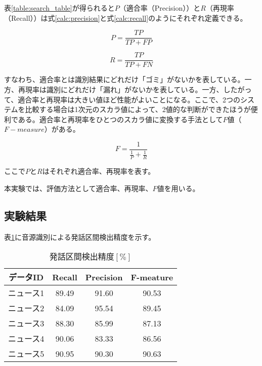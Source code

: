 表\ref{table:search_table}が得られると$P$（適合率（Precision））と$R$（再現率（Recall））は式\ref{calc:precision}と式\ref{calc:recall}のようにそれぞれ定義できる。

\begin{equation}
\label{calc:precision}
P = \frac{TP}{TP + FP}
\end{equation}

\begin{equation}
\label{calc:recall}
R = \frac{TP}{TP + FN}
\end{equation}

すなわち、適合率とは識別結果にどれだけ「ゴミ」がないかを表している。一方、再現率は識別にどれだけ「漏れ」がないかを表している。一方、したがって、適合率と再現率は大きい値ほど性能がよいことになる。ここで、2つのシステムを比較する場合は1次元のスカラ値によって、2値的な判断ができたほうが便利である。適合率と再現率をひとつのスカラ値に変換する手法として$F$値（$F-measure$）がある。

\begin{equation}
\label{calc:fmeasure}
F = \frac{1}{\frac{1}{P} + \frac{1}{R}}
\end{equation}

ここで$P$と$R$はそれぞれ適合率、再現率を表す。\par
本実験では、評価方法として適合率、再現率、$F$値を用いる。
\subsection{実験結果}
表\ref{table:test_detail_RPF}に音源識別による発話区間検出精度を示す。

\begin{table}[H]
  \begin{center}
    \caption{発話区間検出精度$[\%]$ \label{table:test_detail_RPF}}
    \begin{tabular}{|c||c|c|c|} \hline
      データID & Recall & Precision & F-meature \\ \hline
      ニュース1 & 89.49 & 91.60 & 90.53 \\ \hline
      ニュース2 & 84.09 & 95.54 & 89.45\\ \hline
      ニュース3 & 88.30 & 85.99 & 87.13 \\ \hline
      ニュース4 & 90.06 & 83.33 & 86.56\\ \hline
      ニュース5 & 90.95 & 90.30 & 90.63\\ \hline
    \end{tabular}
  \end{center}
\end{table}

